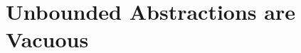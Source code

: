 \documentclass{article}
\newcommand{\by}{\mathbf{y}}
\newcommand{\hiddenspace}{\mathcal{H}}
\newcommand{\layer}{\ell}
\newcommand{\causalmap}{\phi}
\begin{document}
\vspace{-3pt}
\section{Unbounded Abstractions are Vacuous} \label{sec:main_theorem}
\vspace{-2pt}

\newcommand{\cmark}{\ding{51}}%
\newcommand{\xmark}{\ding{55}}%
\newcommand{\noninter}{\text{\ding{117}}}%
\newcommand{\inter}{\text{\ding{118}}}%

\newcommand{\crossproduct}{\prod}

\newcommand{\LastInterventionLayer}{\hat{\layer}}
\newcommand{\AllActivationsLayer}{\hiddenspace_{\neuronset_{\layer}}}
\newcommand{\AllActivationsLayerH}[1]{\hiddenspace_{\neuronset_{#1}}}
\newcommand{\AllActivationsLayerClass}{\hiddenspace_{\neuronset_{\layer}}^{(\class)}}
\newcommand{\AllActivationsLayerClassSub}{\hat{\hiddenspace}_{\neuronset_{\layer}}^{(\class)}}
\newcommand{\AllActivationsLayerClassSubH}[2]{\hat{\hiddenspace}_{\neuronset_{#1}}^{(#2)}}
\newcommand{\AllInpIntActivationsLayer}{\hiddenspace_{\neuronset_{\layer}}^{\noninter}}
\newcommand{\AllInpIntActivationsLayerH}[1]{\hiddenspace_{\neuronset_{#1}}^{\noninter}}

\newcommand{\AllInpIntActivationsLayerIntervenedH}[1]{\bar{\hiddenspace}_{\neuronset_{#1}}}
\newcommand{\AllLatentVaraiblesIntervenedH}[1]{\hat{\hiddenspace}_{\neuronset^{\causalmap}_{#1}}}

\newcommand{\AllInpIntActivationsLayerTwo}{\hiddenspace_{\neuronset_{\layer}}^{\inter}}
\newcommand{\AllInpIntActivationsLayerTwoH}[1]{\hiddenspace_{\neuronset_{#1}}^{\inter}}
\newcommand{\AllInpIntTransformedActivationsLayer}{\hiddenspace_{\neuronset^{\causalmap}_{\layer}}}
\newcommand{\AllInpIntTransformedActivationsLayerOneH}[1]{\hiddenspace^{\noninter}_{\neuronset^\causalmap_{#1}}}
\newcommand{\AllInpIntTransformedActivationsLayerTwoH}[1]{\hiddenspace^{\inter}_{\neuronset^\causalmap_{#1}}}

\newcommand{\MLPPredictedClass}{c}
\newcommand{\featurefunc}{g}
\newcommand{\nodemap}{\mathtt{nodemap}}
\newcommand{\bystar}{{\by^{\star}}}
\newcommand{\class}{\bystar}
\end{document}
